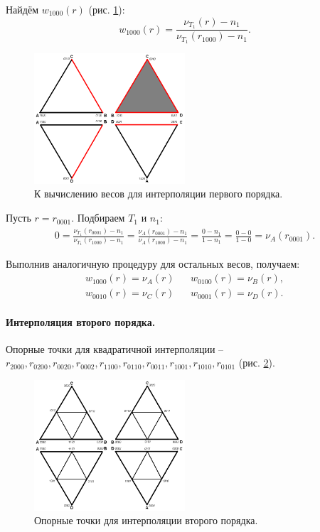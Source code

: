 Найдём $w_{1000}(r)$ (рис. \ref{pic:tetr-interpolation-1st-order-2}):
\begin{equation}
w_{1000}(r) = \frac{ \nu_{T_1}(r) - n_1 }{ \nu_{T_1}(r_{1000}) - n_1 }.
\end{equation}

\begin{figure}[h]
\centering
\includegraphics[width=0.5\textwidth]{png/tetr-interp-1st-order-2.png}
\caption{К вычислению весов для интерполяции первого порядка.}
\label{pic:tetr-interpolation-1st-order-2}
\end{figure}

Пусть $r = r_{0001}$. Подбираем $T_1$ и $n_1$:
\begin{align}
0 = \frac{ \nu_{T_1}(r_{0001}) - n_1 }{ \nu_{T_1}(r_{1000}) - n_1 } = \frac{ \nu_{A}(r_{0001}) - n_1 }{ \nu_{A}(r_{1000}) - n_1 } = \frac{0-n_1}{1-n_1} = \frac{0-0}{1-0} = \nu_{A}(r_{0001}).
\end{align}

Выполнив аналогичную процедуру для остальных весов, получаем:
\begin{align}
w_{1000}(r) = \nu_{A}(r) & & w_{0100}(r) = \nu_{B}(r), \nonumber\\
w_{0010}(r) = \nu_{C}(r) & & w_{0001}(r) = \nu_{D}(r).
\end{align}


\paragraph{Интерполяция второго порядка.} Опорные точки для квадратичной интерполяции -- $r_{2000}, r_{0200}, r_{0020}, r_{0002}, r_{1100}, r_{0110}, r_{0011}, r_{1001}, r_{1010}, r_{0101}$ (рис. \ref{pic:tetr-interpolation-2nd-order-1}).

\begin{figure}[h]
\centering
\includegraphics[width=0.5\textwidth]{png/tetr-interp-2nd-order-1.png}
\caption{Опорные точки для интерполяции второго порядка.}
\label{pic:tetr-interpolation-2nd-order-1}
\end{figure}


